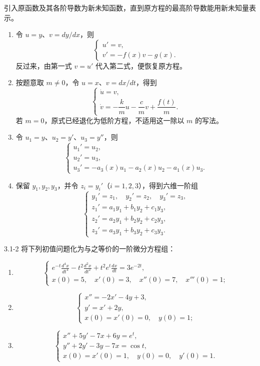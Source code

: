 \documentclass[UTF8,a4paper,11pt]{ctexart}
\begin{document}
\begin{solution}
引入原函数及其各阶导数为新未知函数，直到原方程的最高阶导数能用新未知量表示。
\begin{enumerate}[label=(\arabic*)]
\item 令 $u=y$、$v=dy/dx$，则
\[
\boxed{\begin{cases}u'=v,\\v'=-f(x)v-g(x).\end{cases}}
\]
反过来，由第一式 $v=u'$ 代入第二式，便恢复原方程。
\item 按题意取 $m\ne0$，令 $u=x$、$v=dx/dt$，得到
\[
\boxed{\begin{cases}\dot u=v,\\\dot v=-\dfrac{k}{m}u-\dfrac{c}{m}v+\dfrac{f(t)}m.\end{cases}}
\]
若 $m=0$，原式已经退化为低阶方程，不适用这一除以 $m$ 的写法。
\item 令 $u_1=y$、$u_2=y'$、$u_3=y''$，则
\[
\boxed{\begin{cases}u_1'=u_2,\\u_2'=u_3,\\
u_3'=-a_3(x)u_1-a_2(x)u_2-a_1(x)u_3.\end{cases}}
\]
\item 保留 $y_1,y_2,y_3$，并令 $z_i=y_i'$（$i=1,2,3$），得到六维一阶组
\[
\boxed{\begin{cases}
y_1'=z_1,\quad y_2'=z_2,\quad y_3'=z_3,\\
z_1'=a_1y_1+b_1y_2+c_1y_3,\\
z_2'=a_2y_1+b_2y_2+c_2y_3,\\
z_3'=a_3y_1+b_3y_2+c_3y_3.
\end{cases}}
\]
\end{enumerate}
\end{solution}

\begin{problem}{3.1-2}
将下列初值问题化为与之等价的一阶微分方程组：
  \begin{enumerate}[label=(\arabic*)]
    \item
    \[
    \begin{cases}
      \displaystyle
      e^{-t}\frac{d^4x}{dt^4}
      -t^2\frac{d^2x}{dt^2}
      +t^2e^t\frac{dx}{dt}
      =3e^{-2t},\\[6pt]
      x(0)=5,\quad x'(0)=3,\quad x''(0)=7,\quad x'''(0)=1;
    \end{cases}
    \]

    \item
    \[
    \begin{cases}
      x''=-2x'-4y+3,\\
      y'=x'+2y,\\
      x(0)=x'(0)=0,\quad y(0)=1;
    \end{cases}
    \]

    \item
    \[
    \begin{cases}
      x''+5y'-7x+6y=e^t,\\
      y''+2y'-3y-7x=\cos t,\\
      x(0)=x'(0)=1,\quad y(0)=0,\quad y'(0)=1.
    \end{cases}
    \]
  \end{enumerate}
\end{problem}
\end{document}
